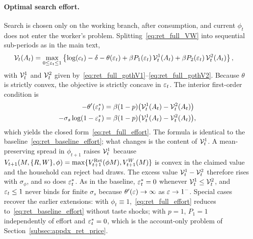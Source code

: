 \paragraph{Optimal search effort.}
Search is chosen only on the working branch, after consumption, and current $\phi_t$ does not enter the worker's problem. Splitting~\eqref{eq:ret_full_VW} into sequential sub-periods as in the main text,
\begin{align}
	\mathcal{V}_t(A_t)
	&= \max_{0\le\varepsilon_t\le 1}
	\left\{
		\log(c_t)-\delta-\theta(\varepsilon_t)
		+\beta P_1(\varepsilon_t)\,\mathcal{V}_t^{1}(A_t)
		+\beta P_2(\varepsilon_t)\,\mathcal{V}_t^{2}(A_t)
	\right\},
	\label{eq:ret_full_gothV}
\end{align}
with $\mathcal{V}_t^{1}$ and $\mathcal{V}_t^{2}$ given by~\eqref{eq:ret_full_gothV1}--\eqref{eq:ret_full_gothV2}. Because $\theta$ is strictly convex, the objective is strictly concave in $\varepsilon_t$. The interior first-order condition is
\begin{align}
	-\theta'(\varepsilon_t^{\ast})
	&= \beta(1-p)\bigl(\mathcal{V}_t^{1}(A_t)-\mathcal{V}_t^{2}(A_t)\bigr)
	\nonumber\\
	-\sigma_s\log(1-\varepsilon_t^{\ast})
	&= \beta(1-p)\bigl(\mathcal{V}_t^{1}(A_t)-\mathcal{V}_t^{2}(A_t)\bigr),
\end{align}
which yields the closed form~\eqref{eq:ret_full_effort}. The formula is identical to the baseline~\eqref{eq:ret_baseline_effort}; what changes is the content of $\mathcal{V}_t^{1}$. A mean-preserving spread in $\phi_{t+1}$ raises $\mathcal{V}_t^{1}$ because $V_{t+1}(M,\{R,W\},\phi)=\max\{V_{t+1}^{\mathrm{Ret}}(\phi M),V_{t+1}^{W}(M)\}$ is convex in the claimed value and the household can reject bad draws. The excess value $\mathcal{V}_t^{1}-\mathcal{V}_t^{2}$ therefore rises with $\sigma_\phi$, and so does $\varepsilon_t^{\ast}$. As in the baseline, $\varepsilon_t^{\ast}=0$ whenever $\mathcal{V}_t^{1}\le\mathcal{V}_t^{2}$, and $\varepsilon_t\le 1$ never binds for finite $\sigma_s$ because $\theta'(\varepsilon)\to\infty$ as $\varepsilon\to 1^{-}$. Special cases recover the earlier extensions: with $\phi_t\equiv 1$,~\eqref{eq:ret_full_effort} reduces to~\eqref{eq:ret_baseline_effort} without taste shocks; with $p=1$, $P_1=1$ independently of effort and $\varepsilon_t^{\ast}=0$, which is the account-only problem of Section~\ref{subsec:appdx_ret_price}.

